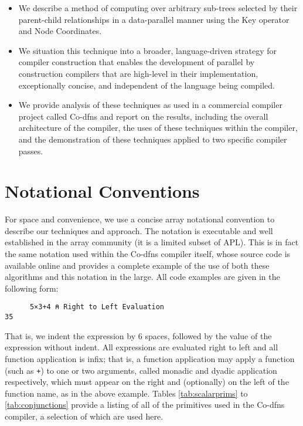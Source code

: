 ﻿\documentclass[numbers,10pt,preprint]{sigplanconf}
\begin{document}
\begin{itemize}[noitemsep]

\item We describe a method of computing over arbitrary sub-trees selected by their parent-child relationships in a data-parallel manner using the Key operator and Node Coordinates.

\item We situation this technique into a broader, language-driven strategy for compiler construction that enables the development of parallel by construction compilers that are high-level in their implementation, exceptionally concise, and independent of the language being compiled.

\item We provide analysis of these techniques as used in a commercial compiler project called Co-dfns and report on the results, including the overall architecture of the compiler, the uses of these techniques within the compiler, and the demonstration of these techniques applied to two specific compiler passes.

\end{itemize}

\section{Notational Conventions}

For space and convenience, we use a concise array notational convention to describe our techniques and approach. The notation is executable and well established in the array community (it is a limited subset of APL). This is in fact the same notation used within the Co-dfns compiler itself, whose source code is available online and provides a complete example of the use of both these algorithms and this notation in the large. All code examples are given in the following form:

\begin{verbatim}
      5×3+4 ⍝ Right to Left Evaluation
35
\end{verbatim}

\noindent That is, we indent the expression by 6 spaces, followed by the value of the expression without indent. All expressions are evaluated right to left and all function application is infix; that is, a function application may apply a function (such as \verb;+;) to one or two arguments, called monadic and dyadic application respectively, which must appear on the right and (optionally) on the left of the function name, as in the above example. Tables \ref{tab:scalarprims} to \ref{tab:conjunctions} provide a listing of all of the primitives used in the Co-dfns compiler, a selection of which are used here.
\end{document}
